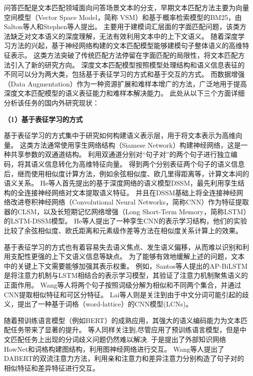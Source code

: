 问答匹配是文本匹配领域面向问答场景文本的分支，早期文本匹配方法主要为向量空间模型（Vector Space Model，简称 VSM）\cite{salton1975vector}和基于概率检索模型的BM25\cite{robertson1994some}，由Salton等人和Stephen等人提出。
主要用于建模词汇层面的字面匹配问题，该类方法缺乏对文本语义的深度理解，无法有效利用文本中的上下文语义。
随着深度学习方法的兴起，基于神经网络构建的文本匹配模型能够建模句子整体语义的高维特征表示。
这类方法突破了传统匹配方法停留在字面匹配的局限性，将文本匹配方法引入了新的研究方向。
深度文本匹配模型按照模型处理结构和语义信息表征的不同可以分为两大类，包括基于表征学习的方式和基于交互的方式。
而数据增强（Data Augmentation）作为一种资源扩展和难样本增广的方法，广泛地用于提高深度文本匹配模型的语义表征能力和难样本解决能力。
此处从以下三个方面详细分析该任务的国内外研究现状：

\textbf{\songti （1）基于表征学习的方式}

基于表征学习的方式集中于研究如何构建语义表示层，用于将文本表示为高维向量。
这类方法通常使用孪生网络结构（Siamese Network）构建神经网络，这是一种共享参数的双通道结构。
利用双通道分别对“句子对”的两个句子进行独立编码，将其语义信息转化为高维特征向量。
得到两个分别表征两个句子的语义信息后，继而使用相似度计算方法，例如余弦相似度、欧几里得距离等，计算文本间的语义关系。
He等人首先提出的基于深度网络的语义模型DSSM\cite{huang2013learning}，最先利用孪生结构的全连接神经网络对文本提取语义特征。
并且在DSSM基础上将全连接神经网络改进卷积神经网络（Convolutional Neural Networks，简称CNN）作为特征提取器的CLSM\cite{shen2014latent}，以及长短期记忆网络增强（Long Short-Term Memory，简称LSTM）的LSTM-DSSM\cite{palangi2014semantic}模型。
He等人提出了一种孪生CNN的表示学习结构\cite{he2015multi}，他们的实验比较了余弦相似度、欧氏距离和元素级作差等方法在相似度关系计算上的效果。

基于表征学习的方式也有着容易失去语义焦点、发生语义偏移，从而难以识别和利用支配性更强的上下文语义信息等缺点。
为了能够有效地缓解上述的问题，文本中的关键上下文需要能够加强其表示权重。
例如，Santos等人提出的AP-BiLSTM\cite{santos2016attentive}是将注意力机制与LSTM相结合的表示学习模型，其验证了注意力机制聚焦语义的正面作用。
Wang等人\cite{wang2016sentence}将两个句子按照词级分解为相似和不同两个集合，并通过CNN提取相似特征和可区分特征。 
Lai等人则是关注到由于中文分词可能引起的歧义，提出了一种基于词格（word-lattice）的CNN模型(LCNs)\cite{lai2019lattice}。

随着预训练语言模型（例如BERT\cite{devlin2018bert}）的成熟应用，其强大的语义编码能力为文本匹配任务带来了显著的提升。
\cite{lyu2021let}等人同样关注到,尽管应用了预训练语言模型，但是中文匹配任务上出现的分词歧义问题仍然难以解决.
于是提出了外部知识网络HowNet\cite{dong2003hownet}和词格构建图结构，利用图神经网络进行交互。
Wang等人提出了DABERT\cite{wang-etal-2022-dabert}的双流注意力方法，利用亲和注意力和差异注意力分别构造了句子对的相似特征和差异特征进行交互。


